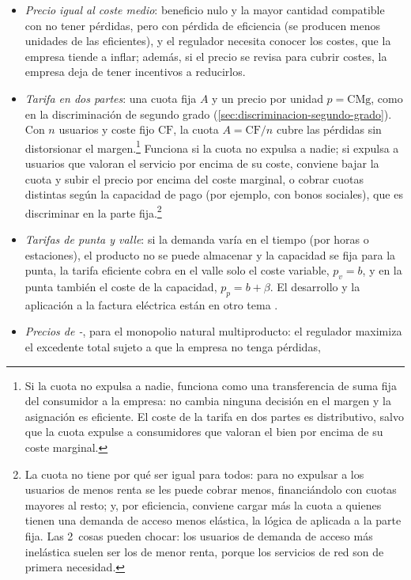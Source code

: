 \documentclass[11pt]{article}
\begin{document}
\begin{itemize}
  \begin{itemize}
  \item \emph{Precio igual al coste medio}: beneficio nulo y la mayor cantidad compatible con no tener pérdidas, pero con pérdida de eficiencia (se producen menos unidades de las eficientes), y el regulador necesita conocer los costes, que la empresa tiende a inflar; además, si el precio se revisa para cubrir costes, la empresa deja de tener incentivos a reducirlos.
  \item \emph{Tarifa en dos partes}\nocite{Coase1946Marginal}: una cuota fija $A$ y un precio por unidad $p=\mathrm{CMg}$, como en la discriminación de segundo grado (\ref{sec:discriminacion-segundo-grado}). Con $n$ usuarios y coste fijo $\mathrm{CF}$, la cuota $A=\mathrm{CF}/n$ cubre las pérdidas sin distorsionar el margen.\footnote{Si la cuota no expulsa a nadie, funciona como una transferencia de suma fija del consumidor a la empresa: no cambia ninguna decisión en el margen y la asignación es eficiente. El coste de la tarifa en dos partes es distributivo, salvo que la cuota expulse a consumidores que valoran el bien por encima de su coste marginal.} Funciona si la cuota no expulsa a nadie; si expulsa a usuarios que valoran el servicio por encima de su coste, conviene bajar la cuota y subir el precio por encima del coste marginal\nocite{Oi1971Disneyland}, o cobrar cuotas distintas según la capacidad de pago (por ejemplo, con bonos sociales), que es discriminar en la parte fija.\footnote{La cuota no tiene por qué ser igual para todos: para no expulsar a los usuarios de menos renta se les puede cobrar menos, financiándolo con cuotas mayores al resto; y, por eficiencia, conviene cargar más la cuota a quienes tienen una demanda de acceso menos elástica, la lógica de  aplicada a la parte fija\nocite{ViscusiHarringtonVernon2005Economics}. Las 2~cosas pueden chocar: los usuarios de demanda de acceso más inelástica suelen ser los de menor renta, porque los servicios de red son de primera necesidad.}
  \item \emph{Tarifas de punta y valle}: si la demanda varía en el tiempo (por horas o estaciones), el producto no se puede almacenar y la capacidad se fija para la punta, la tarifa eficiente cobra en el valle solo el coste variable, $p_v=b$, y en la punta también el coste de la capacidad, $p_p=b+\beta$\nocite{Boiteux1949Tarification,Steiner1957Peak}. El desarrollo y la aplicación a la factura eléctrica están en otro tema .
  \item \emph{Precios de -}, para el monopolio natural multiproducto: el regulador maximiza el excedente total sujeto a que la empresa no tenga pérdidas,

\end{itemize}
\end{itemize}
\end{document}
